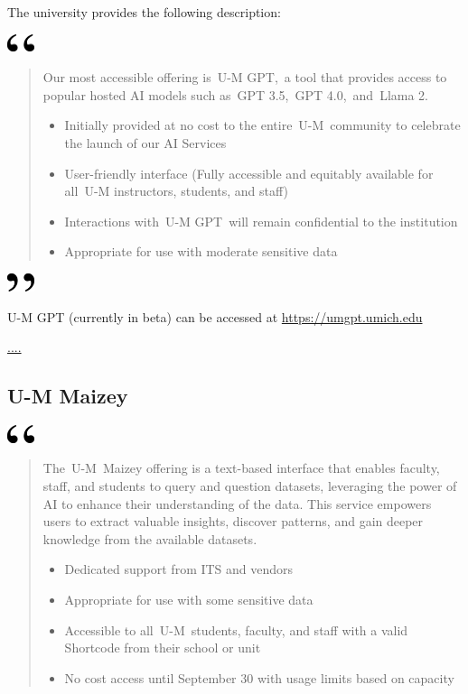 \documentclass[
]{book}
\begin{document}
The university provides the following description:

\includegraphics[width=0.3125in,height=0.20833in]{open.png}

\begin{quote}
Our most accessible offering is~U-M GPT,~a tool that provides access to popular hosted AI models such as~GPT 3.5,~GPT 4.0,~and~Llama 2.

\begin{itemize}
\item
  Initially provided at no cost to the entire~U-M~community to celebrate the launch of our AI Services
\item
  User-friendly interface (Fully accessible and equitably available for all~U-M instructors, students, and staff)
\item
  Interactions with~U-M GPT~will remain confidential to the institution
\item
  Appropriate for use with moderate sensitive data
\end{itemize}
\end{quote}

\includegraphics[width=0.3125in,height=0.20833in]{close.png}

U-M GPT (currently in beta) can be accessed at \url{https://umgpt.umich.edu}

\url{....}

\hypertarget{u-m-maizey}{%
\subsection{U-M Maizey}\label{u-m-maizey}}

\includegraphics[width=0.3125in,height=0.20833in]{open.png}

\begin{quote}
The~U-M~Maizey offering is a text-based interface that enables faculty, staff, and students to query and question datasets, leveraging the power of AI to enhance their understanding of the data. This service empowers users to extract valuable insights, discover patterns, and gain deeper knowledge from the available datasets.

\begin{itemize}
\item
  Dedicated support from ITS and vendors
\item
  Appropriate for use with some sensitive data
\item
  Accessible to all~U-M~students, faculty, and staff with a valid Shortcode from their school or unit
\item
  No cost access until September 30 with usage limits based on capacity
\end{itemize}
\end{quote}
\end{document}
